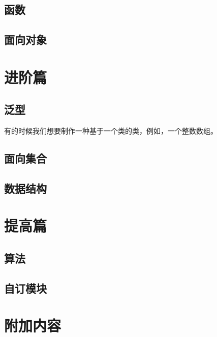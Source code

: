 \documentclass{tufte-book}
\begin{document}
	\chapter{函数}
	\chapter{面向对象}
	
\part{进阶篇}
	\chapter{泛型}
		有的时候我们想要制作一种基于一个类的类，例如，一个整数数组。
		
	\chapter{面向集合}
	\chapter{数据结构}
	
\part{提高篇}
	\chapter{算法}
	\chapter{自订模块}
	
\backmatter
\part{附加内容}
	\printindex
\newpage
\end{document}
